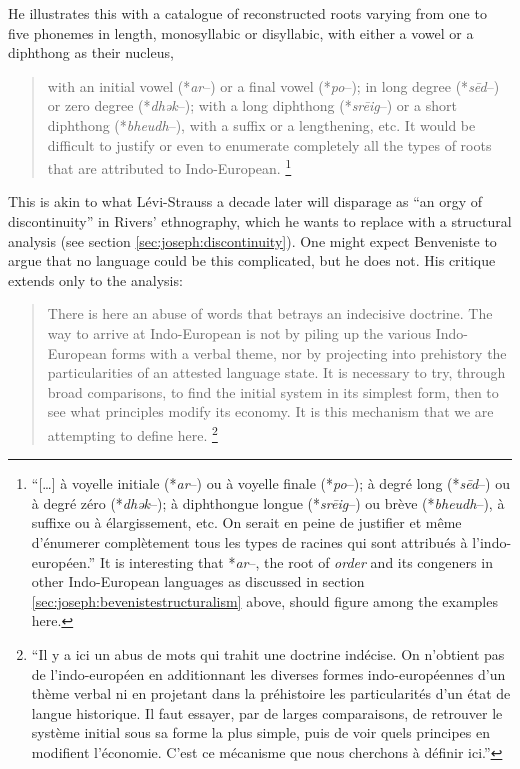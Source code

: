 \documentclass[output=paper]{langscibook}
\begin{document}
He illustrates this with a catalogue of reconstructed roots varying from one to five phonemes in length, monosyllabic or disyllabic, with either a vowel or a diphthong as their nucleus, 

\begin{quotation}
with an initial vowel (*\emph{ar}--) or a final vowel (*\emph{po}--); in long degree (*\emph{sēd}--) or zero degree (*\emph{dhək}--); with a long diphthong (*\emph{srēig}--) or a short diphthong (*\emph{bheudh}--), with a suffix or a lengthening, etc. It would be difficult to justify or even to enumerate completely all the types of roots that are attributed to Indo-European. \citep[147]{Benveniste1935}\footnote{``[…] à voyelle initiale (*\emph{ar}--) ou à voyelle finale (*\emph{po}--); à degré long (*\emph{sēd}--) ou à degré zéro (*\emph{dhək}--); à diphthongue longue (*\emph{srēig}--) ou brève (*\emph{bheudh}--), à suffixe ou à élargissement, etc. On serait en peine de justifier et même d’énumerer complètement tous les types de racines qui sont attribués à l’indo-européen.'' It is interesting that *\emph{ar}--, the root of \emph{order} and its congeners in other Indo-European languages as discussed in section \ref{sec:joseph:bevenistestructuralism} above, should figure among the examples here.}
\end{quotation}

This is akin to what Lévi-Strauss a decade later will disparage as ``an orgy of discontinuity'' in Rivers' ethnography, which he wants to replace with a structural analysis (see section \ref{sec:joseph:discontinuity}). One might expect Benveniste to argue that no language could be this complicated, but he does not. His critique extends only to the analysis:

\begin{quotation}
There is here an abuse of words that betrays an indecisive doctrine. The way to arrive at Indo-European is not by piling up the various Indo-European forms with a verbal theme, nor by projecting into prehistory the particularities of an attested language state. It is necessary to try, through broad comparisons, to find the initial system in its simplest form, then to see what principles modify its economy. It is this mechanism that we are attempting to define here. \citep[147--148]{Benveniste1935}\footnote{``Il y a ici un abus de mots qui trahit une doctrine indécise. On n'obtient pas de l'indo-européen en additionnant les diverses formes indo-européennes d'un thème verbal ni en projetant dans la préhistoire les particularités d'un état de langue historique. Il faut essayer, par de larges comparaisons, de retrouver le système initial sous sa forme la plus simple, puis de voir quels principes en modifient l'économie. C'est ce mécanisme que nous cherchons à définir ici.''}
\end{quotation}
\end{document}
